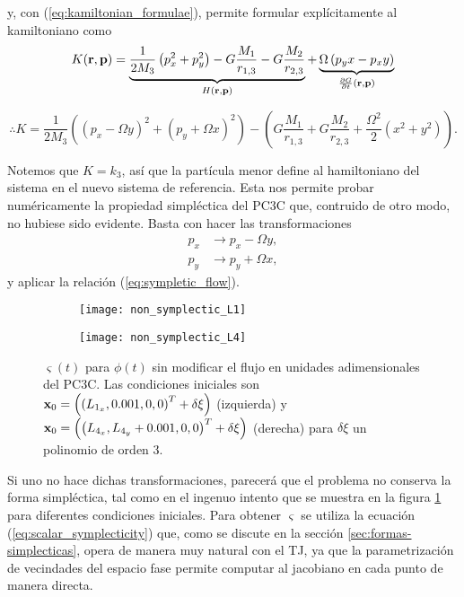 y, con (\ref{eq:kamiltonian_formulae}), permite formular explícitamente al kamiltoniano como
\begin{equation*}
 K(\mathbf{r}, \mathbf{p}) = \underbrace{ \frac{1}{2M_3}\left( p_x^2 + p_y^2 \right) - G \frac{M_1}{r_{1,3}} - G \frac{M_2}{r_{2,3}}}_{H(\mathbf{r}, \mathbf{p}) } + \underbrace{\Omega\left( p_y x - p_x y \right) }_{\frac{\partial G}{\partial t}(\mathbf{r}, \mathbf{p})}
\end{equation*}

\begin{equation}
 \therefore K = \frac{1}{2M_3} \left( (p_x - \Omega y)^2 + (p_y + \Omega x)^2 \right) - \left(G \frac{M_1}{r_{1,3}} + G \frac{M_2}{r_{2,3}} + \frac{\Omega^2}{2}\left( x^2 + y^2 \right) \right).
 \label{eq:kamiltonian}
\end{equation}

Notemos que $K = k_3$, así que la partícula menor define al hamiltoniano del sistema en el nuevo sistema de referencia. Esta nos permite probar numéricamente la propiedad simpléctica del PC3C que, contruido de otro modo, no hubiese sido evidente. Basta con hacer las transformaciones 
\begin{align}
p_x &\to p_x - \Omega y, \\
p_y &\to p_y + \Omega x,
\label{eq:momentum_transformation}
\end{align} 
y aplicar la relación (\ref{eq:sympletic_flow}).

\begin{figure}[h!]
\centering
\begin{subfigure}{0.49\textwidth}
	\centering
	\texttt{[image: non\_symplectic\_L1]}
\end{subfigure}
%
\begin{subfigure}{0.49\textwidth}
	\centering
	\texttt{[image: non\_symplectic\_L4]}
\end{subfigure}
\caption{ $\varsigma(t)$ para $\phi(t)$ sin modificar el flujo en unidades adimensionales del PC3C. Las condiciones iniciales son $\mathbf{x}_0 = \left( \left( L_{1_x}, 0.001, 0, 0 \right)^T + \delta \xi \right) $ (izquierda) y $ \mathbf{x}_0 = \left( \left( L_{4_x}, L_{4_y} + 0.001, 0, 0 \right)^T + \delta \xi \right) $ (derecha) para $\delta \xi$ un polinomio de orden $3$.}
\label{fig:non_symplectic_L4_L1}
\end{figure}

Si uno no hace dichas transformaciones, parecerá que el problema no conserva la forma simpléctica, tal como en el ingenuo intento que se muestra en la figura \ref{fig:non_symplectic_L4_L1} para diferentes condiciones iniciales. Para obtener $\varsigma$ se utiliza la ecuación (\ref{eq:scalar_symplecticity}) que, como se discute en la sección \ref{sec:formas-simplecticas}, opera de manera muy natural con el TJ, ya que la parametrización de vecindades del espacio fase permite computar al jacobiano en cada punto de manera directa.

